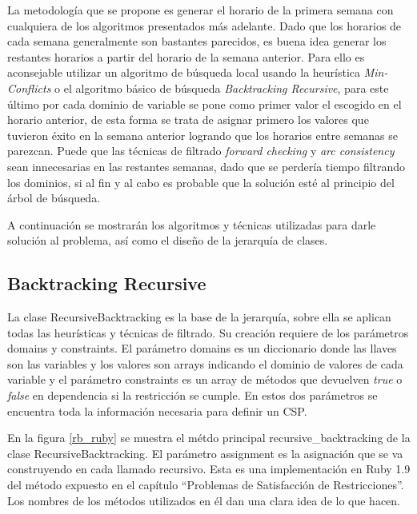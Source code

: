 La metodolog\'ia que se propone es generar el horario de la primera semana con cualquiera de los algoritmos presentados m\'as adelante. Dado que los horarios de cada semana generalmente son bastantes parecidos, es buena idea generar los restantes horarios a partir del horario de la semana anterior. Para ello es aconsejable utilizar un algoritmo de b\'usqueda local usando la heur\'istica \emph{Min-Conflicts} o el algoritmo b\'asico de b\'usqueda \emph{Backtracking Recursive}, para este \'ultimo por cada dominio de variable se pone como primer valor el escogido en el horario anterior, de esta forma se trata de asignar primero los valores que tuvieron \'exito en la semana anterior logrando que los horarios entre semanas se parezcan. Puede que las t\'ecnicas de filtrado \emph{forward checking} y \emph{arc consistency} sean innecesarias en las restantes semanas, dado que se perder\'ia tiempo filtrando los dominios, si al fin y al cabo es probable que la soluci\'on est\'e al principio del \'arbol de b\'usqueda.

A continuaci\'on se mostrar\'an los algoritmos y t\'ecnicas utilizadas para darle soluci\'on al problema, as\'i como el diseño de la jerarqu\'ia de clases.

\subsection{Backtracking Recursive}

La clase \textsf{RecursiveBacktracking} es la base de la jerarqu\'ia, sobre ella se aplican todas las heur\'isticas y t\'ecnicas de filtrado. Su creaci\'on requiere de los par\'ametros \textsf{domains} y \textsf{constraints}. El par\'ametro \textsf{domains} es un diccionario donde las llaves son las variables y los valores son arrays indicando el dominio de valores de cada variable y el par\'ametro \textsf{constraints} es un array de m\'etodos que devuelven \emph{true} o \emph{false} en dependencia si la restricci\'on se cumple. En estos dos par\'ametros se encuentra toda la informaci\'on necesaria para definir un CSP.

En la figura \ref{rb_ruby} se muestra el m\'etdo principal \textsf{recursive\_backtracking} de la clase \textsf{RecursiveBacktracking}. El par\'ametro \textsf{assignment} es la asignaci\'on que se va construyendo en cada llamado recursivo. Esta es una implementaci\'on en Ruby 1.9 del m\'etodo expuesto en el cap\'itulo ``Problemas de Satisfacci\'on de Restricciones''. Los nombres de los m\'etodos utilizados en \'el dan una clara idea de lo que hacen.

